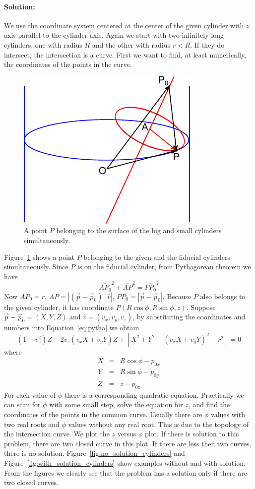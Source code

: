 \paragraph{Solution:} We use the coordinate system centered at the center of the given cylinder with $z$ axis parallel to the cylinder axis. Again we start with two infinitely long cylinders, one with radius $R$ and the other with radius $r<R$. If they do intersect, the intersection is a curve. First we want to find, at least numerically, the coordinates of the points in the curve.
\begin{figure}
	\centering
	\includegraphics[width=.5\textwidth]{figures/appendixA/inscribe.pdf}
	\caption{A point $P$ belonging to the surface of the big and small cylinders simultaneously.}
	\label{fig:inscribe}
\end{figure}
Figure~\ref{fig:inscribe} shows a point $P$ belonging to the given and the fiducial cylinders simultaneously. Since $P$ is on the fiducial cylinder, from Pythagorean theorem we have
\begin{equation}\label{eq:pytha}
	\overline{AP_0}^2+\overline{AP}^2=\overline{PP_0}^2
\end{equation}
Now $\overline{AP_0}=r$, $\overline{AP}=|(\vec{p}-\vec{p}_0)\cdot \hat{v}|$, $\overline{PP_0}=|\vec{p}-\vec{p}_0|$. Because $P$ also belongs to the given cylinder, it has coordinate $P(R\cos\phi,R\sin\phi,z)$. Suppose $\vec{p}-\vec{p}_0=(X,Y,Z)$ and $\hat{v}=(v_x,v_y,v_z)$, by substituting the coordinates and numbers into Equation~\ref{eq:pytha} we obtain
\begin{equation}
	(1-v_z^2)Z-2v_z(v_xX+v_yY)Z+[X^2+Y^2-(v_xX+v_yY)^2-r^2]=0
\end{equation}
where
\begin{eqnarray}
	X &=& R\cos\phi-p_{0x} \\
	Y &=& R\sin\phi-p_{0y} \\
	Z &=& z-p_{0z}
\end{eqnarray}
For each value of $\phi$ there is a corresponding quadratic equation. Practically we can scan for $\phi$ with some small step, solve the equation for $z$, and find the coordinates of the points in the common curve. Usually there are $\phi$ values with two real roots and $\phi$ values without any real root. This is due to the topology of the intersection curve. We plot the $z$ versus $\phi$ plot. If there is solution to this problem, there are two closed curve in this plot. If there are less then two curves, there is no solution. Figure~\ref{fig:no_solution_cylinders} and Figure~\ref{fig:with_solution_cylinders} show examples without and with solution. From the figures we clearly see that the problem has a solution only if there are two closed curves.
